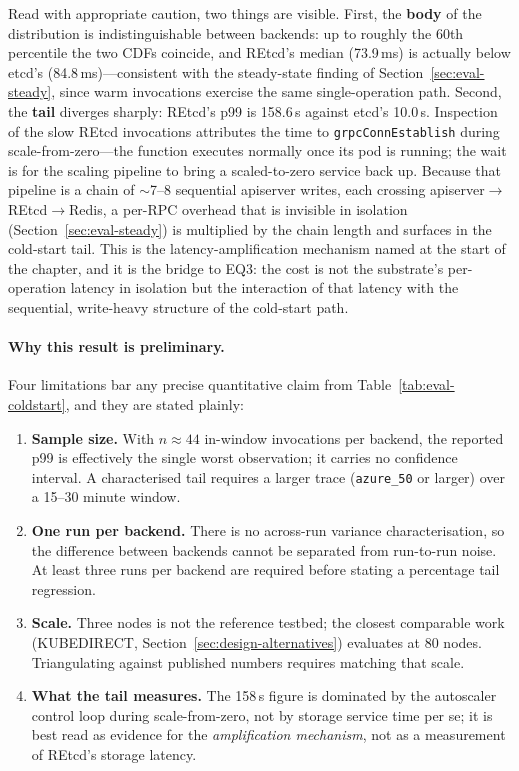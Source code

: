 Read with appropriate caution, two things are visible. First, the \textbf{body} of the distribution is indistinguishable between backends: up to roughly the 60th percentile the two CDFs coincide, and REtcd's median (73.9\,ms) is actually below etcd's (84.8\,ms)---consistent with the steady-state finding of Section~\ref{sec:eval-steady}, since warm invocations exercise the same single-operation path. Second, the \textbf{tail} diverges sharply: REtcd's p99 is 158.6\,s against etcd's 10.0\,s. Inspection of the slow REtcd invocations attributes the time to \texttt{grpcConnEstablish} during scale-from-zero---the function executes normally once its pod is running; the wait is for the scaling pipeline to bring a scaled-to-zero service back up. Because that pipeline is a chain of $\sim$7--8 sequential apiserver writes, each crossing apiserver$\rightarrow$REtcd$\rightarrow$Redis, a per-RPC overhead that is invisible in isolation (Section~\ref{sec:eval-steady}) is multiplied by the chain length and surfaces in the cold-start tail. This is the latency-amplification mechanism named at the start of the chapter, and it is the bridge to EQ3: the cost is not the substrate's per-operation latency in isolation but the interaction of that latency with the sequential, write-heavy structure of the cold-start path.

\paragraph{Why this result is preliminary.}
Four limitations bar any precise quantitative claim from Table~\ref{tab:eval-coldstart}, and they are stated plainly:

\begin{enumerate}
    \item \textbf{Sample size.} With $n \approx 44$ in-window invocations per backend, the reported p99 is effectively the single worst observation; it carries no confidence interval. A characterised tail requires a larger trace (\texttt{azure\_50} or larger) over a 15--30 minute window.
    \item \textbf{One run per backend.} There is no across-run variance characterisation, so the difference between backends cannot be separated from run-to-run noise. At least three runs per backend are required before stating a percentage tail regression.
    \item \textbf{Scale.} Three nodes is not the reference testbed; the closest comparable work (KUBEDIRECT, Section~\ref{sec:design-alternatives}) evaluates at 80 nodes. Triangulating against published numbers requires matching that scale.
    \item \textbf{What the tail measures.} The 158\,s figure is dominated by the autoscaler control loop during scale-from-zero, not by storage service time per se; it is best read as evidence for the \emph{amplification mechanism}, not as a measurement of REtcd's storage latency.
\end{enumerate}

